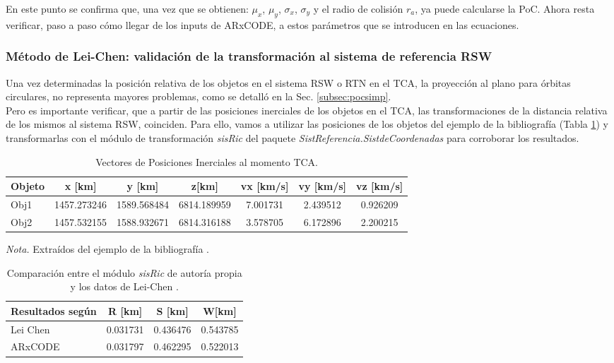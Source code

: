 En este punto se confirma que, una vez que se obtienen: $\mu_{x}$, $\mu_{y}$, $\sigma_{x}$, $\sigma_{y}$ y el radio de colisi\'on $r_{a}$, ya puede calcularse la PoC. 
Ahora resta verificar, paso a paso c\'omo llegar de los inputs de ARxCODE, a estos par\'ametros que se introducen en las ecuaciones. \\

\subsubsection*{M\'etodo de Lei-Chen: validaci\'on de la transformaci\'on al sistema de referencia RSW}

Una vez determinadas la posici\'on relativa de los objetos en el sistema RSW o RTN en el TCA, la proyecci\'on al plano para \'orbitas circulares, no representa mayores problemas, como se detall\'o en la Sec. \ref{subsec:pocsimp}.\\

Pero es importante verificar, que a partir de las posiciones inerciales de los objetos en el TCA, las transformaciones de la distancia relativa de los mismos al sistema RSW, coinciden.
Para ello, vamos a utilizar las posiciones de los objetos del ejemplo de la bibliograf\'ia (Tabla \ref{tab:vectejemplo}) y transformarlas con el m\'odulo de transformaci\'on {\it{sisRic}} del paquete {\it{SistReferencia.SistdeCoordenadas}} para corroborar los resultados.

\begin{table}[!h]
\caption{Vectores de Posiciones Inerciales al momento TCA.}
\begin{tabular}{lcccccc}
\hline
Objeto & x [km] & y [km] &z[km] &vx [km/s] &vy [km/s] &vz [km/s]\\
\hline
Obj1 & 1457.273246 &1589.568484&6814.189959&7.001731&2.439512&0.926209\\
Obj2 & 1457.532155&1588.932671&6814.316188&3.578705&6.172896&2.200215\\
\hline
\end{tabular}
\label{tab:vectejemplo}
\begin{flushleft}
\small {\it{Nota.}} Extra\'idos del ejemplo de la bibliograf\'ia \citep{leichen}.
\end{flushleft}
\end{table}

\begin{table}[!h]
\caption{Comparaci\'on entre el m\'odulo {\it{sisRic}} de autor\'ia propia \\y los datos de Lei-Chen \citep{leichen}.}
\begin{tabular}{lccc}
\hline
Resultados seg\'un & R [km] & S [km] & W[km] \\
\hline
Lei Chen & 0.031731& 0.436476&0.543785\\
ARxCODE & 0.031797& 0.462295 &0.522013
\\
\hline
\end{tabular}
\label{tab:rswcomp}
\end{table}


